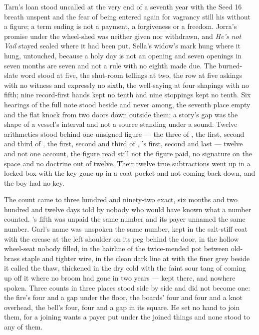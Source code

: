 Tarn's loan stood uncalled at the very end of a seventh year with the Seed 16 breath unspent and the fear of being entered again for vagrancy still his without a figure; a term ending is not a payment, a forgiveness or a freedom. Jorra's promise under the wheel-shed was neither given nor withdrawn, and \emph{He's not Vail} stayed sealed where it had been put. Sella's widow's mark hung where it hung, untouched, because a holy day is not an opening and seven openings in seven months are seven and not a rule with no eighth made due. The burned-slate word stood at five, the shut-room tellings at two, the row at five askings with no witness and expressly no sixth, the well-saying at four shapings with no fifth; nine record-first hands kept no tenth and nine stoppings kept no tenth. Six hearings of the full note stood beside and never among, the seventh place empty and the flat knock from two doors down outside them; a story's gap was the shape of a vessel's interval and not a source standing under a sound. Twelve arithmetics stood behind one unsigned figure --- the three of , the first, second and third of , the first, second and third of , 's first, second and last --- twelve and not one account, the figure read still not the figure paid, no signature on the space and no doctrine out of twelve. Their twelve true subtractions went up  in a locked box with the key gone up in a coat pocket and not coming back down, and the boy had no key.

The count came to three hundred and ninety-two exact, six months and two hundred and twelve days told by nobody who would have known what a number counted. 's fifth was unpaid the same number and its payer unnamed the same number. Garl's name was unspoken the same number, kept in the salt-stiff coat with the crease at the left shoulder on its peg behind the door, in the hollow wheel-seat nobody filled, in the hairline of the twice-mended pot between old-brass staple and tighter wire, in the clean dark line at  with the finer grey beside it called the thaw, thickened in the dry cold with the faint sour tang of  coming up off it where no broom had gone in two years --- kept there, and nowhere spoken. Three counts in three places stood side by side and did not become one: the fire's four and a gap under the floor, the boards' four and four and a knot overhead, the bell's four, four and a gap in its square. He set no hand to join them, for a joining wants a payer put under the joined things and none stood to any of them.

